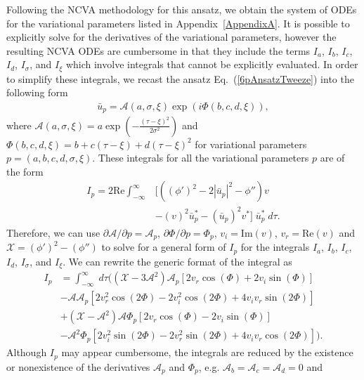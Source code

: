 \documentclass[aps,floatfix,showpacs,preprintnumbers,twocolumn,nofootinbib]{revtex4}
\begin{document}
Following the NCVA methodology for this ansatz, we obtain the system of ODEs for the variational parameters listed in Appendix~\ref{AppendixA}.  It is possible to explicitly solve for the derivatives of the variational parameters, however the resulting NCVA ODEs are cumbersome in that they include the terms $I_a$, $I_b$, $I_c$, $I_d$, $I_{\sigma}$, and $I_{\xi}$ which involve integrals that cannot be explicitly evaluated.  In order to simplify these integrals, we recast the ansatz Eq.~(\ref{6pAnsatzTweeze}) into the following form
\begin{align}
\bar{u}_p = \mathcal{A}(a, \sigma, \xi) \exp(i \Phi (b, c, d, \xi)),
\end{align}
where $\mathcal{A}(a,\sigma, \xi) = a \exp (-\frac{(\tau-\xi)^2}{2\sigma^2})$  and $\Phi(b,c,d,\xi) = b+c(\tau - \xi) + d (\tau-\xi)^2$ for variational parameters $p = (a, b, c, d, \sigma, \xi)$. 
These integrals for all the variational parameters $p$ are of the form
\begin{align}
I_p = 2 \mathrm{Re} \int_{-\infty}^{\infty} & \Big[\left((\phi')^2  - 2 |\bar{u}_p|^2- \phi''\right) v \nonumber \\
&-  (v)^2 \bar{u}_p^* - (\bar{u}_p)^2 v^* \Big] \; \bar{u}_p^* \;  d\tau.
\end{align}
Therefore, we can use $ \partial \mathcal{A}/ \partial p = \mathcal{A}_p$, $\partial \Phi/ \partial p = \Phi_p$, $v_i = \mathrm{Im}(v)$,  $v_r = \mathrm{Re}(v)$ and $\mathcal{X} = (\phi')^2-(\phi'')$  to solve for a general form of $I_{p}$ for the integrals $I_a$, $I_b$, $I_c$, $I_d$, $I_{\sigma}$, and $I_{\xi}$.  We can rewrite the generic format of the integral as 
\begin{align}
I_p &=\int_{-\infty}^{\infty} \; d\tau \Big(  \left(\mathcal{X}  - 3\mathcal{A}^2\right) \mathcal{A}_p \left[ 2 v_r \cos(\Phi) + 2 v_i \sin(\Phi) \right]  \nonumber \\
&- \mathcal{A}\mathcal{A}_p \left[2v_r^2 \cos(2\Phi) - 2 v_i^2\cos(2\Phi) + 4 v_i v_r \sin(2\Phi) \right]  \nonumber \\
&+ \left( \mathcal{X}  - \mathcal{A}^2\right) \mathcal{A} \Phi_p \left[ 2 v_r \cos(\Phi) - 2 v_i \sin(\Phi) \right]  \nonumber \\
&- \mathcal{A}^2\Phi_p \left[2v_i^2 \sin(2\Phi) - 2 v_r^2\sin(2\Phi) + 4 v_i v_r \cos(2\Phi) \right] 
\Big).
\end{align}
Although $I_p$ may appear cumbersome, the integrals are reduced by the existence or nonexistence of the derivatives $\mathcal{A}_p$ and $\Phi_p$, e.g. $\mathcal{A}_b = \mathcal{A}_c = \mathcal{A}_d = 0$ and 
\end{document}
